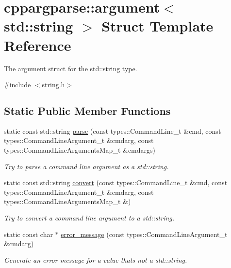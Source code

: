 \hypertarget{structcppargparse_1_1argument_3_01std_1_1string_01_4}{}\section{cppargparse\+:\+:argument$<$ std\+:\+:string $>$ Struct Template Reference}
\label{structcppargparse_1_1argument_3_01std_1_1string_01_4}


The argument struct for the std\+::string type.  




{\ttfamily \#include $<$string.\+h$>$}

\subsection*{Static Public Member Functions}
\begin{DoxyCompactItemize}
\item 
static const std\+::string \hyperlink{structcppargparse_1_1argument_3_01std_1_1string_01_4_a59f51e61ddf11929299211600a36180c}{parse} (const types\+::\+Command\+Line\+\_\+t \&cmd, const types\+::\+Command\+Line\+Argument\+\_\+t \&cmdarg, const types\+::\+Command\+Line\+Arguments\+Map\+\_\+t \&cmdargs)
\begin{DoxyCompactList}\small\item\em Try to parse a command line argument as a std\+::string. \end{DoxyCompactList}\item 
static const std\+::string \hyperlink{structcppargparse_1_1argument_3_01std_1_1string_01_4_a97a68548d5ba012e551d2fb2de6083c2}{convert} (const types\+::\+Command\+Line\+\_\+t \&cmd, const types\+::\+Command\+Line\+Argument\+\_\+t \&cmdarg, const types\+::\+Command\+Line\+Arguments\+Map\+\_\+t \&)
\begin{DoxyCompactList}\small\item\em Try to convert a command line argument to a std\+::string. \end{DoxyCompactList}\item 
static const char $\ast$ \hyperlink{structcppargparse_1_1argument_3_01std_1_1string_01_4_ae5172423c61ac176e9c8b018c0ad91c0}{error\+\_\+message} (const types\+::\+Command\+Line\+Argument\+\_\+t \&cmdarg)
\begin{DoxyCompactList}\small\item\em Generate an error message for a value that\textquotesingle{}s not a std\+::string. \end{DoxyCompactList}\end{DoxyCompactItemize}


